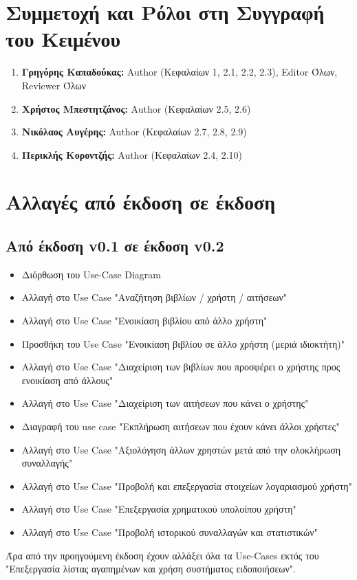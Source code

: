 \documentclass[12pt,a4paper]{article}
\begin{document}
\section{Συμμετοχή και Ρόλοι στη Συγγραφή του Κειμένου}
\begin{enumerate}
	\item \textbf{Γρηγόρης Καπαδούκας:} Author (Κεφαλαίων 1, 2.1, 2.2, 2.3), Editor Όλων, Reviewer Όλων
	\item \textbf{Χρήστος Μπεστητζάνος:} Author (Κεφαλαίων 2.5, 2.6)
   	\item \textbf{Νικόλαος Αυγέρης:} Author (Κεφαλαίων 2.7, 2.8, 2.9)
	\item \textbf{Περικλής Κοροντζής:} Author (Κεφαλαίων 2.4, 2.10)
\end{enumerate}
\section{Αλλαγές από έκδοση σε έκδοση}

\subsection{Από έκδοση v0.1 σε έκδοση v0.2}
\begin{itemize}
    \item Διόρθωση του Use-Case Diagram
    \item Αλλαγή στο Use Case "Αναζήτηση βιβλίων / χρήστη / αιτήσεων"
    \item Αλλαγή στο Use Case "Ενοικίαση βιβλίου από άλλο χρήστη"
    \item Προσθήκη του Use Case "Ενοικίαση βιβλίου σε άλλο χρήστη (μεριά ιδιοκτήτη)"
    \item Αλλαγή στο Use Case "Διαχείριση των βιβλίων που προσφέρει ο χρήστης προς ενοικίαση από άλλους"
    \item Αλλαγή στο Use Case "Διαχείριση των αιτήσεων που κάνει ο χρήστης"
    \item Διαγραφή του use case "Εκπλήρωση αιτήσεων που έχουν κάνει άλλοι χρήστες"
    \item Αλλαγή στο Use Case "Αξιολόγηση άλλων χρηστών μετά από την ολοκλήρωση συναλλαγής"
    \item Αλλαγή στο Use Case "Προβολή και επεξεργασία στοιχείων λογαριασμού χρήστη"
    \item Αλλαγή στο Use Case "Επεξεργασία χρηματικού υπολοίπου χρήστη"
    \item Αλλαγή στο Use Case "Προβολή ιστορικού συναλλαγών και στατιστικών"
\end{itemize}
Άρα από την προηγούμενη έκδοση έχουν αλλάξει όλα τα Use-Cases εκτός του "Επεξεργασία λίστας αγαπημένων και χρήση συστήματος ειδοποιήσεων".
\end{document}
